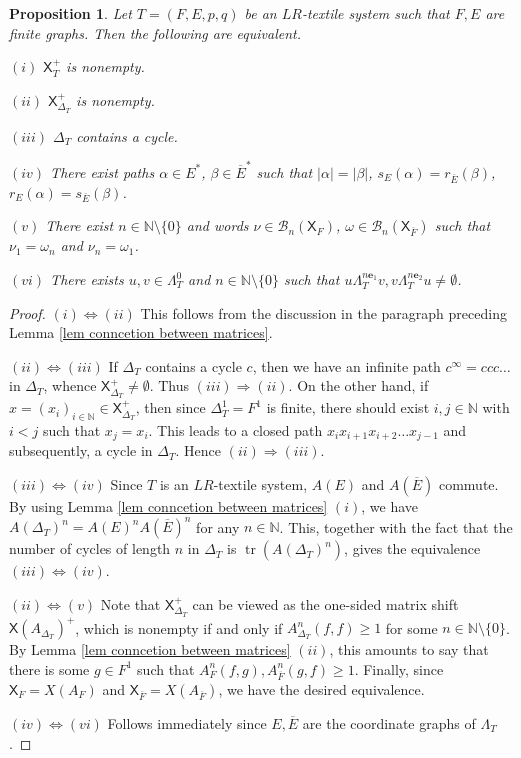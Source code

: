 \documentclass[a4paper,reqno,12pt]{amsart}
\newtheorem{prop}[thm]{Proposition}
\theoremstyle{definition}
\theoremstyle{remark}
\newcommand{\tr}{\operatorname{tr}}
\begin{document}
\begin{prop}\label{pro characterizing nonemptyness}
Let $T=(F,E,p,q)$ be an $LR$-textile system such that $F,E$ are finite graphs. Then the following are equivalent.

$(i)$ $\mathsf{X}_T^+$ is nonempty.

$(ii)$ $\mathsf{X}_{\Delta_T}^+$ is nonempty.

$(iii)$ $\Delta_T$ contains a cycle.

$(iv)$ There exist paths $\alpha\in E^*$, $\beta\in \overline{E}^*$ such that $|\alpha|=|\beta|$, $s_E(\alpha)=r_{\overline{E}}(\beta)$, $r_E(\alpha)=s_{\overline{E}}(\beta)$. 

$(v)$ There exist $n\in \mathbb{N}\setminus \{0\}$ and words $\nu\in \mathcal{B}_n(\mathsf{X}_F)$, $\omega\in \mathcal{B}_n(\mathsf{X}_{\overline{F}})$ such that $\nu_1=\omega_n$ and $\nu_n=\omega_1$. 

$(vi)$ There exists $u,v\in \Lambda_T^0$ and $n\in \mathbb{N}\setminus \{0\}$ such that $u\Lambda_T^{n\mathbf{e}_1}v,v\Lambda_T^{n\mathbf{e}_2}u\neq \emptyset$. 
\end{prop}
\begin{proof}
$(i)\Leftrightarrow (ii)$ This follows from the discussion in the paragraph preceding Lemma \ref{lem conncetion between matrices}. 

$(ii)\Leftrightarrow (iii)$ If $\Delta_T$ contains a cycle $c$, then we have an infinite path $c^\infty=ccc\ldots$ in $\Delta_T$, whence $\mathsf{X}_{\Delta_T}^+\neq \emptyset$. Thus $(iii)\Rightarrow (ii)$. On the other hand, if $x=(x_i)_{i\in \mathbb{N}}\in \mathsf{X}_{\Delta_T}^+$, then since $\Delta_T^1=F^1$ is finite, there should exist $i,j\in \mathbb{N}$ with $i< j$ such that $x_j=x_i$. This leads to a closed path $x_i x_{i+1} x_{i+2}\ldots x_{j-1}$ and subsequently, a cycle in $\Delta_T$. Hence $(ii)\Rightarrow (iii)$. 

$(iii)\Leftrightarrow (iv)$ Since $T$ is an $LR$-textile system, $A(E)$ and $A(\overline{E})$ commute. By using Lemma \ref{lem conncetion between matrices} $(i)$, we have $A(\Delta_T)^n=A(E)^nA(\overline{E})^n$ for any $n\in \mathbb{N}$. This, together with the fact that the number of cycles of length $n$ in $\Delta_T$ is $\tr(A(\Delta_T)^n)$, gives the equivalence $(iii)\Leftrightarrow (iv)$. 

$(ii)\Leftrightarrow (v)$ Note that $\mathsf{X}_{\Delta_T}^+$ can be viewed as the one-sided matrix shift $\mathsf{X}(A_{\Delta_T})^+$, which is nonempty if and only if $A_{\Delta_T}^n(f,f)\ge 1$ for some $n\in \mathbb{N}\setminus \{0\}$. By Lemma \ref{lem conncetion between matrices} $(ii)$, this amounts to say that there is some $g\in F^1$ such that $A_F^n(f,g),A_{\overline{F}}^n(g,f)\ge 1$. Finally, since $\mathsf{X}_F=X(A_F)$ and $\mathsf{X}_{\overline{F}}=X(A_{\overline{F}})$, we have the desired equivalence. 

$(iv)\Leftrightarrow (vi)$ Follows immediately since $E,\overline{E}$ are the coordinate graphs of $\Lambda_T$.  
\end{proof}
\end{document}
